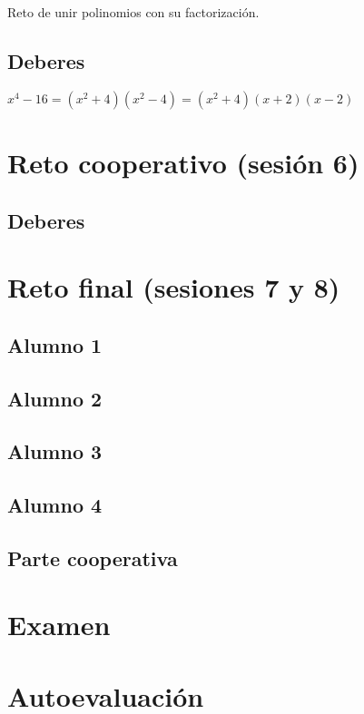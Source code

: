 Reto de unir polinomios con su factorización.

\subsection{Deberes}
\label{ses4:deberes}

$x^4-16 = (x^2+4)(x^2-4) = (x^2+4)(x+2)(x-2)$

\section{Reto cooperativo (sesión 6)}
\label{ses6:coop}

\subsection{Deberes}
\label{ses6:deberes}



\section{Reto final (sesiones 7 y 8)}
\label{ses7:indiv}

\subsection{Alumno 1}


\subsection{Alumno 2}


\subsection{Alumno 3}


\subsection{Alumno 4}



\subsection{Parte cooperativa}
\label{ses7:coop}


\section{Examen}
\label{examen}

\section{Autoevaluación}
\label{app:autoeval}